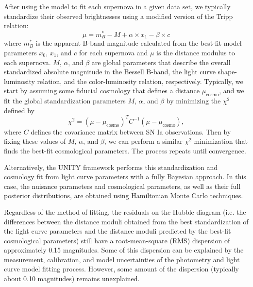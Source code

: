 After using the model to fit each supernova in a given data set, we typically standardize their observed brightnesses using a modified version of the Tripp relation:
\begin{equation}
    \mu = m_B^* - M + \alpha \times x_1 - \beta\times c
    \label{eqn:standardization}
\end{equation}
where $m_B^*$ is the apparent B-band magnitude calculated from the best-fit model parameters $x_0$, $x_1$, and $c$ for each supernova and $\mu$ is the distance modulus to each supernova. $M$, $\alpha$, and $\beta$ are global parameters that describe the overall standardized absolute magnitude in the  Bessell B-band, the light curve shape-luminosity relation, and the color-luminosity relation, respectively. Typically, we start by assuming some fiducial cosmology that defines a distance $\mu_\text{cosmo}$, and we fit the global standardization parameters $M$, $\alpha$, and $\beta$ by minimizing the $\chi^2$ defined by
$$\chi^2 = (\mu - \mu_\text{cosmo})^T C^{-1} (\mu - \mu_\text{cosmo}),$$
where $C$ defines the covariance matrix between SN Ia observations. Then by fixing these values of $M$, $\alpha$, and $\beta$, we can perform a similar $\chi^2$ minimization that finds the best-fit cosmological parameters. The process repeats until convergence.

Alternatively, the UNITY framework \citep{rubin_unity_2015} performs this standardization and cosmology fit from light curve parameters with a fully Bayesian approach. In this case, the nuisance parameters and cosmological parameters, as well as their full posterior distributions, are obtained using Hamiltonian Monte Carlo techniques.

Regardless of the method of fitting, the residuals on the Hubble diagram (i.e. the differences between the distance moduli obtained from the best standardization of the light curve parameters and the distance moduli predicted by the best-fit cosmological parameters) still have a root-mean-square (RMS) dispersion of approximately 0.15 magnitudes. Some of this dispersion can be explained by the measurement, calibration, and model uncertainties of the photometry and light curve model fitting process. However, some amount of the dispersion (typically about 0.10 magnitudes) remains unexplained.

